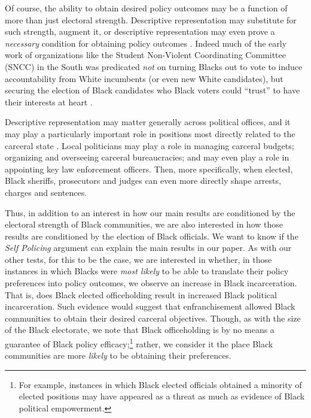 \documentclass[12pt]{article}
\begin{document}
Of course, the ability to obtain desired policy outcomes may be a function of more than just electoral strength.  Descriptive representation may substitute for such strength, augment it, or descriptive representation may even prove a \emph{necessary} condition for obtaining policy outcomes .  Indeed much of the early work of organizations like the Student Non-Violent Coordinating Committee (SNCC) in the South was predicated \emph{not} on turning Blacks out to vote to induce accountability from White incumbents (or even new White candidates), but securing the election of Black candidates who Black voters could ``trust'' to have their interests at heart .

Descriptive representation may matter generally across political offices, and it may play a particularly important role in positions most directly related to the carceral state .  Local politicians may play a role in managing carceral budgets; organizing and overseeing carceral bureaucracies; and may even play a role in appointing key law enforcement officers.  Then, more specifically, when elected, Black sheriffs, prosecutors and judges can even more directly shape arrests, charges and sentences.

Thus, in addition to an interest in how our main results are conditioned by the electoral strength of Black communities, we are also interested in how those results are conditioned by the election of Black officials.  We want to know if the \emph{Self Policing} argument can explain the main results in our paper.  As with our other tests, for this to be the case, we are interested in whether, in those instances in which Blacks were \emph{most likely} to be able to translate their policy preferences into policy outcomes, we observe an increase in Black incarceration.  That is, does Black elected officeholding result in increased Black political incarceration.  Such evidence would suggest that enfranchisement allowed Black communities to obtain their desired carceral objectives.  Though, as with the size of the Black electorate, we note that Black officeholding is by no means a guarantee of Black policy efficacy;\footnote{For example, instances in which Black elected officials obtained a minority of elected positions may have appeared as a threat as much as evidence of Black political empowerment. } rather, we consider it the place Black communities are more \emph{likely} to be obtaining their preferences.
\end{document}
